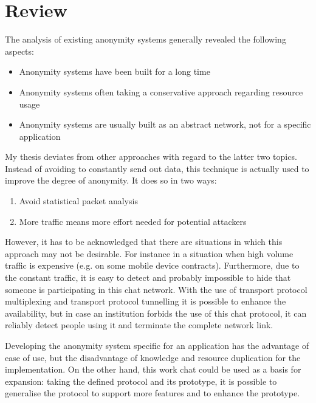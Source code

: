\section{Review}
The analysis of existing anonymity systems generally revealed the
following aspects:
\begin{itemize}
\item Anonymity systems have been built for a long time
\item Anonymity systems often taking a conservative approach regarding resource usage
\item Anonymity systems are usually built as an abstract network, not for a specific application
\end{itemize}
My thesis deviates from other approaches with regard to the latter two topics.
Instead of avoiding to constantly send out data, this technique is actually
used to improve the degree of anonymity. It does so in two ways:
\begin{enumerate}
\item Avoid statistical packet analysis
\item More traffic means more effort needed for potential attackers
\end{enumerate}
However, it has to be acknowledged that there are situations
in which this approach may not be desirable.
For instance in a situation when high volume traffic is expensive
(e.g. on some mobile device contracts).
Furthermore, due to the constant traffic, it is easy to detect and probably
impossible to hide that someone is participating in this chat network.
With the use of transport protocol multiplexing and transport protocol
tunnelling it is possible to enhance the availability, but in case an
institution forbids the use of this chat protocol, it can reliably
detect people using it and terminate the complete network link.

Developing the anonymity system specific for an application has the advantage
of ease of use, but the disadvantage of knowledge and resource duplication
for the implementation. On the other hand, this work
chat could be used as a basis for expansion: taking the
defined protocol and its prototype, it is possible to generalise
the protocol to support more features and to enhance the prototype.
